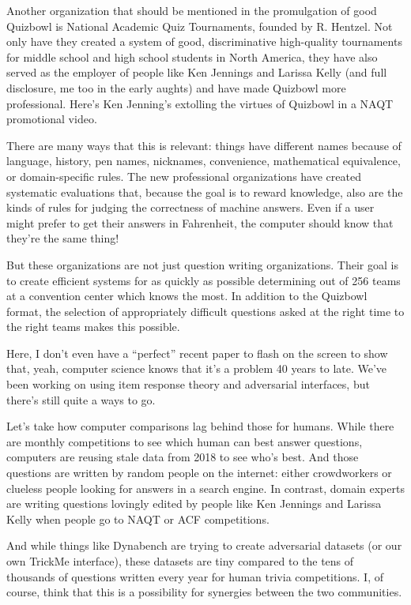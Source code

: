 Another organization that should be mentioned in the promulgation of good Quizbowl is National Academic Quiz Tournaments, founded by R. Hentzel.  Not only have they created a system of good, discriminative high-quality tournaments for middle school and high school students in North America, they have also served as the employer of people like Ken Jennings and Larissa Kelly (and full disclosure, me too in the early aughts) and have made Quizbowl more professional.  Here’s Ken Jenning’s extolling the virtues of Quizbowl in a NAQT promotional video.

There are many ways that this is relevant: things have different names because of language, history, pen names, nicknames, convenience, mathematical equivalence, or domain-specific rules.  The new professional organizations have created systematic evaluations that, because the goal is to reward knowledge, also are the kinds of rules for judging the correctness of machine answers.  Even if a user might prefer to get their answers in Fahrenheit, the computer should know that they’re the same thing!

But these organizations are not just question writing organizations.  Their goal is to create efficient systems for as quickly as possible determining out of 256 teams at a convention center which knows the most.  In addition to the Quizbowl format, the selection of appropriately difficult questions asked at the right time to the right teams makes this possible.

Here, I don’t even have a “perfect” recent paper to flash on the screen to show that, yeah, computer science knows that it’s a problem 40 years to late.  We’ve been working on using item response theory and adversarial interfaces, but there’s still quite a ways to go.  

Let’s take how computer comparisons lag behind those for humans.  While there are monthly competitions to see which human can best answer questions, computers are reusing stale data from 2018 to see who’s best.  And those questions are written by random people on the internet: either crowdworkers or clueless people looking for answers in a search engine.  In contrast, domain experts are writing questions lovingly edited by people like Ken Jennings and Larissa Kelly when people go to NAQT or ACF competitions.  

And while things like Dynabench are trying to create adversarial datasets (or our own TrickMe interface), these datasets are tiny compared to the tens of thousands of questions written every year for human trivia competitions.  I, of course, think that this is a possibility for synergies between the two communities.

